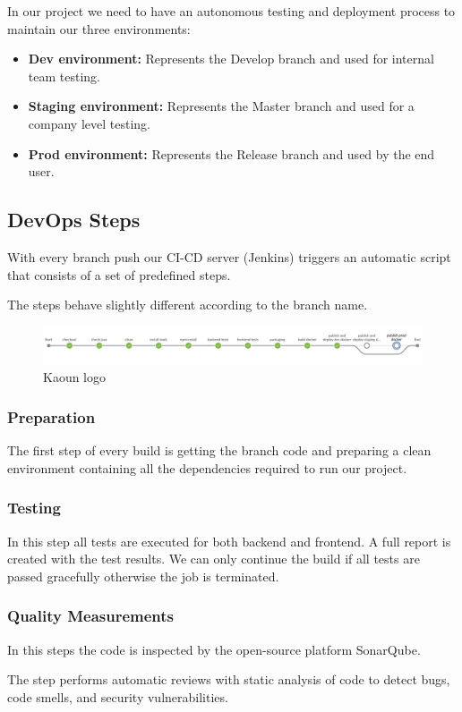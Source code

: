 \begin{spacing}{1.2}
In our project we need to have an autonomous testing and deployment process to maintain our three environments:
\begin{itemize}
	\item \textbf{Dev environment:} Represents the Develop branch and used for internal team testing.
	\item \textbf{Staging environment:} Represents the Master branch and used for a company level testing.
    \item \textbf{Prod environment:} Represents the Release branch and used by the end user.
\end{itemize}

\subsection{DevOps Steps}
With every branch push our CI-CD server (Jenkins) triggers an automatic script that consists of a set of predefined steps.

The steps behave slightly different according to the branch name.
\begin{figure}[!h]\centering
\includegraphics[scale=0.3]{jenkins.png}
\caption{Kaoun logo}
\label{fig:fig1}
\end{figure}
\subsubsection{Preparation}
The first step of every build is getting the branch code and preparing a clean environment containing all the dependencies required to run our project.
\subsubsection{Testing}
In this step all tests are executed for both backend and frontend. A full report is created with the test results.
We can only continue the build if all tests are passed gracefully otherwise the job is terminated.
\subsubsection{Quality Measurements}
In this steps the code is inspected by the open-source platform SonarQube.

The step performs automatic reviews with static analysis of code to detect bugs, code smells, and security vulnerabilities.

\end{spacing}
